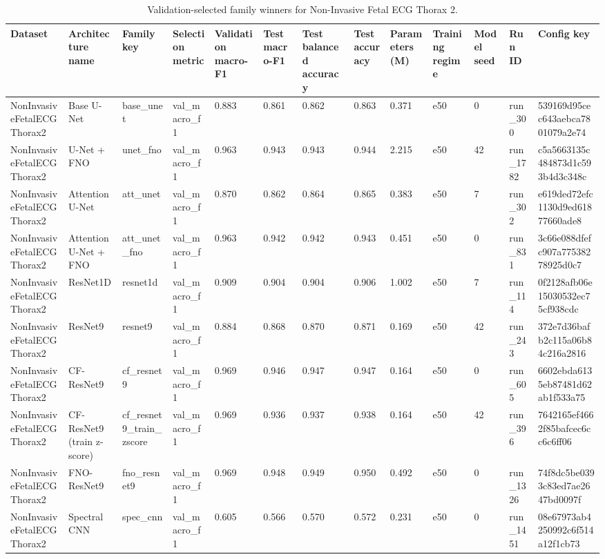 \begin{table}
\caption{Validation-selected family winners for Non-Invasive Fetal ECG Thorax 2.}
\label{tab:noninvasivefetalecgthorax2_best_model_performance}
\begin{tabular}{lllllllllllll}
\toprule
Dataset & Architecture name & Family key & Selection metric & Validation macro-F1 & Test macro-F1 & Test balanced accuracy & Test accuracy & Parameters (M) & Training regime & Model seed & Run ID & Config key \\
\midrule
NonInvasiveFetalECGThorax2 & Base U-Net & base\_unet & val\_macro\_f1 & 0.883 & 0.861 & 0.862 & 0.863 & 0.371 & e50 & 0 & run\_300 & 539169d95cec643aebca7801079a2e74 \\
NonInvasiveFetalECGThorax2 & U-Net + FNO & unet\_fno & val\_macro\_f1 & 0.963 & 0.943 & 0.943 & 0.944 & 2.215 & e50 & 42 & run\_1782 & c5a5663135c484873d1c593b4d3c348c \\
NonInvasiveFetalECGThorax2 & Attention U-Net & att\_unet & val\_macro\_f1 & 0.870 & 0.862 & 0.864 & 0.865 & 0.383 & e50 & 7 & run\_302 & e619ded72efc1130d9ed61877660ade8 \\
NonInvasiveFetalECGThorax2 & Attention U-Net + FNO & att\_unet\_fno & val\_macro\_f1 & 0.963 & 0.942 & 0.942 & 0.943 & 0.451 & e50 & 0 & run\_831 & 3c66e088dfefc907a77538278925d0c7 \\
NonInvasiveFetalECGThorax2 & ResNet1D & resnet1d & val\_macro\_f1 & 0.909 & 0.904 & 0.904 & 0.906 & 1.002 & e50 & 7 & run\_114 & 0f2128afb06e15030532ec75cf938cdc \\
NonInvasiveFetalECGThorax2 & ResNet9 & resnet9 & val\_macro\_f1 & 0.884 & 0.868 & 0.870 & 0.871 & 0.169 & e50 & 42 & run\_243 & 372e7d36bafb2c115a06b84c216a2816 \\
NonInvasiveFetalECGThorax2 & CF-ResNet9 & cf\_resnet9 & val\_macro\_f1 & 0.969 & 0.946 & 0.947 & 0.947 & 0.164 & e50 & 0 & run\_605 & 6602ebda6135eb87481d62ab1f533a75 \\
NonInvasiveFetalECGThorax2 & CF-ResNet9 (train z-score) & cf\_resnet9\_train\_zscore & val\_macro\_f1 & 0.969 & 0.936 & 0.937 & 0.938 & 0.164 & e50 & 42 & run\_396 & 7642165ef4662f85bafcec6cc6c6ff06 \\
NonInvasiveFetalECGThorax2 & FNO-ResNet9 & fno\_resnet9 & val\_macro\_f1 & 0.969 & 0.948 & 0.949 & 0.950 & 0.492 & e50 & 0 & run\_1326 & 74f8dc5be0393c83ed7ae2647bd0097f \\
NonInvasiveFetalECGThorax2 & Spectral CNN & spec\_cnn & val\_macro\_f1 & 0.605 & 0.566 & 0.570 & 0.572 & 0.231 & e50 & 0 & run\_1451 & 08e67973ab4250992c6f514a12f1cb73 \\

\end{tabular}
\end{table}
